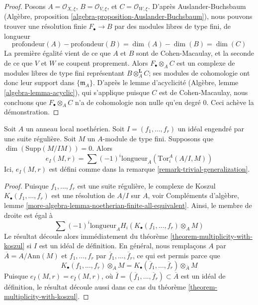 \begin{proof}
Posons $A = \mathcal{O}_{X, \xi}$, $B = \mathcal{O}_{V, \xi}$, et
$C = \mathcal{O}_{W, \xi}$. D'après Auslander-Buchsbaum
(Algèbre, proposition \ref{algebra-proposition-Auslander-Buchsbaum}),
nous pouvons trouver une résolution finie $F_\bullet \to B$ par des modules libres
de type fini, de longueur
$$
\text{profondeur}(A) - \text{profondeur}(B) =
\dim(A) - \dim(B) = \dim(C)
$$
La première égalité vient de ce que $A$ et $B$ sont de Cohen-Macaulay, et la seconde
de ce que $V$ et $W$ se coupent proprement. Alors $F_\bullet \otimes_A C$ est un
complexe de modules libres de type fini représentant $B \otimes_A^\mathbf{L} C$;
ses modules de cohomologie ont donc leur support dans $\{\mathfrak m_A\}$.
D'après le lemme d'acyclicité (Algèbre, lemme \ref{algebra-lemma-acyclic}),
qui s'applique puisque $C$ est de Cohen-Macaulay,
nous concluons que $F_\bullet \otimes_A C$ n'a de
cohomologie non nulle qu'en degré $0$. Ceci achève la démonstration.
\end{proof}

\begin{lemma}
\label{lemma-one-ideal-ci}
Soit $A$ un anneau local noethérien. Soit $I = (f_1, \ldots, f_r)$ un idéal
engendré par une suite régulière. Soit $M$ un $A$-module de type fini. Supposons que
$\dim(\text{Supp}(M/IM)) = 0$. Alors
$$
e_I(M, r) = \sum (-1)^i\text{longueur}_A(\text{Tor}_i^A(A/I, M))
$$
Ici, $e_I(M, r)$ est défini comme dans la remarque \ref{remark-trivial-generalization}.
\end{lemma}

\begin{proof}
Puisque $f_1, \ldots, f_r$ est une suite régulière, le complexe de Koszul
$K_\bullet(f_1, \ldots, f_r)$ est une résolution de $A/I$ sur $A$, voir
Compléments d'algèbre, lemme
\ref{more-algebra-lemma-noetherian-finite-all-equivalent}.
Ainsi, le membre de droite est égal à
$$
\sum (-1)^i\text{longueur}_A H_i(K_\bullet(f_1, \ldots, f_r) \otimes_A M)
$$
Le résultat découle alors immédiatement du
théorème \ref{theorem-multiplicity-with-koszul} si $I$ est un idéal
de définition. En général, nous remplaçons $A$ par $\overline{A} = A/\text{Ann}(M)$
et $f_1, \ldots, f_r$ par $\overline{f}_1, \ldots, \overline{f}_r$,
ce qui est permis parce que
$$
K_\bullet(f_1, \ldots, f_r) \otimes_A M =
K_\bullet(\overline{f}_1, \ldots, \overline{f}_r) \otimes_{\overline{A}} M
$$
Puisque $e_I(M, r) = e_{\overline{I}}(M, r)$, où
$\overline{I} = (\overline{f}_1, \ldots, \overline{f}_r) \subset \overline{A}$
est un idéal de définition, le résultat découle aussi dans ce cas du
théorème \ref{theorem-multiplicity-with-koszul}.
\end{proof}

